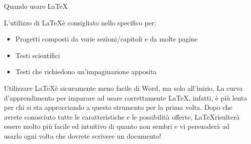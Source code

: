 \begin{frame}{Quando usare \LaTeX}

	L'utilizzo di \LaTeX è consigliato nello specifico per:
	\begin{itemize}
		\item Progetti composti da varie sezioni/capitoli e da molte pagine
		\item Testi scientifici
		\item Testi che richiedono un'impaginazione apposita
	\end{itemize}
	\vfill
	Utilizzare \LaTeX è sicuramente meno facile di Word, ma solo all'inizio. La curva d'apprendimento per imparare
	ad usare correttamente \LaTeX, infatti, è più lenta per chi si sta approcciando a questo strumento per la prima volta.
	Dopo che avrete conosciuto tutte le caratteristiche e le possibilità offerte, \LaTeX risulterà essere molto
	più facile ed intuitivo di quanto non sembri e vi persuaderà ad usarlo ogni volta che dovrete scrivere un documento!
\end{frame}